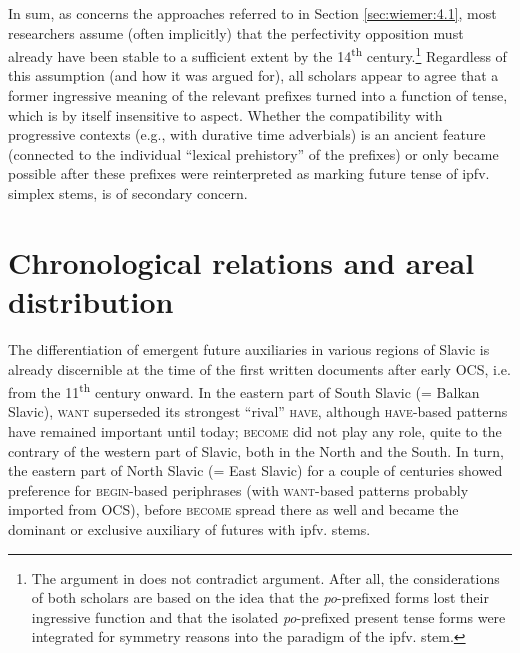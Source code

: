 \documentclass[output=paper,colorlinks,citecolor=brown]{langscibook}
\begin{document}
In sum, as concerns the approaches referred to in Section \ref{sec:wiemer:4.1}, most researchers assume (often implicitly) that the perfectivity opposition must already have been stable to a sufficient extent by the 14\textsuperscript{th} century.\footnote{The argument in \citet[]{Němec2009b} does not contradict  argument. After all, the considerations of both scholars are based on the idea that the \textit{po}-prefixed forms lost their ingressive function and that the isolated \textit{po}-prefixed present tense forms were integrated for symmetry reasons into the paradigm of the ipfv. stem.} Regardless of this assumption (and how it was argued for), all scholars appear to agree that a former ingressive meaning of the relevant prefixes turned into a function of tense, which is by itself insensitive to aspect. Whether the compatibility with progressive contexts (e.g., with durative time adverbials) is an ancient feature (connected to the individual “lexical prehistory” of the prefixes) or only became possible after these prefixes were reinterpreted as marking future tense of ipfv. simplex stems, is of secondary concern.



\section{Chronological relations and areal distribution}\label{sec:wiemer:5}

The differentiation of emergent future auxiliaries in various regions of Slavic is already discernible at the time of the first written documents after early OCS, i.e. from the 11\textsuperscript{th} century onward. In the eastern part of South Slavic (= Balkan Slavic), \textsc{want} superseded its strongest “rival” \textsc{have}, although \textsc{have}-based patterns have remained important until today; \textsc{become} did not play any role, quite to the contrary of the western part of Slavic, both in the North and the South. In turn, the eastern part of North Slavic (= East Slavic) for a couple of centuries showed preference for \textsc{begin}-based periphrases (with \textsc{want}-based patterns probably imported from OCS), before \textsc{become} spread there as well and became the dominant or exclusive auxiliary of futures with ipfv. stems.
\end{document}
